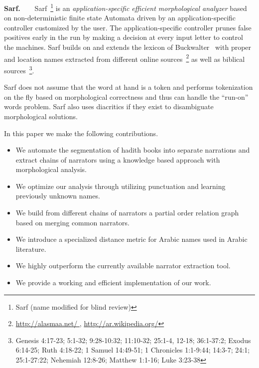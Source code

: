 \documentclass[11pt]{article}
\begin{document}

{\bf Sarf.~~~}
Sarf~\footnote{Sarf (name modified for blind review) }
is 
an {\em application-specific efficient
morphological analyzer} based on
non-deterministic finite state Automata 
driven by an application-specific controller customized 
by the user. 
The application-specific controller prunes false positives
early in the run by making a decision at every input letter
to control the machines.
Sarf builds on and extends the lexicon of 
Buckwalter~ 
with proper and location names extracted from different online 
sources~\footnote{\href{http://alasmaa.net/}{http://alasmaa.net/ }, 
\href{http://ar.wikipedia.org/}{http://ar.wikipedia.org/}}
as well as biblical sources~\footnote{Genesis 4:17-23; 5:1-32; 9:28-10:32; 11:10-32; 25:1-4, 12-18; 36:1-37:2; Exodus 6:14-25; Ruth 4:18-22; 1 Samuel 14:49-51; 1 Chronicles 1:1-9:44; 14:3-7; 24:1; 25:1-27:22; Nehemiah 12:8-26; Matthew 1:1-16; Luke 3:23-38}.

Sarf does not assume that the word at hand is a token and
performs tokenization on the fly based on morphological correctness
and thus can handle 
the ``run-on'' words problem. 
Sarf also uses diacritics if they exist to disambiguate 
morphological solutions. 

In this paper we make the following contributions. 
\begin{itemize}
\item We automate the segmentation of hadith books into separate narrations and extract chains of narrators 
using a knowledge based approach with morphological analysis.
\item We optimize our analysis through utilizing punctuation and learning previously unknown names.
\item We build from different chains of narrators a partial order relation graph based on merging common narrators.
\item We introduce a specialized distance metric for Arabic names used in Arabic literature. 
\item We highly outperform the currently available narrator extraction tool. 
\item We provide a working and efficient implementation of our work. 
\end{itemize}
\end{document}
